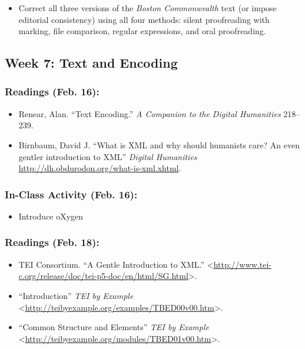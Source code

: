 \documentclass[]{article}
\begin{document}
\begin{itemize}
\itemsep1pt\parskip0pt
\item
  Correct all three versions of the \emph{Boston Commonwealth} text (or
  impose editorial consistency) using all four methods: silent
  proofreading with marking, file comparison, regular expressions, and
  oral proofreading.
\end{itemize}

\subsection{Week 7: Text and Encoding}\label{week-7-text-and-encoding}

\subsubsection{Readings (Feb. 16):}\label{readings-feb.-16}

\begin{itemize}
\itemsep1pt\parskip0pt
\item
  Renear, Alan. ``Text Encoding.'' \emph{A Companion to the Digital
  Humanities} 218--239.
\item
  Birnbaum, David J. ``What is XML and why should humanists care? An
  even gentler introduction to XML'' \emph{Digital Humanities}
  \url{http://dh.obdurodon.org/what-is-xml.xhtml}.
\end{itemize}

\subsubsection{In-Class Activity (Feb.
16):}\label{in-class-activity-feb.-16}

\begin{itemize}
\itemsep1pt\parskip0pt
\item
  Introduce oXygen
\end{itemize}

\subsubsection{Readings (Feb. 18):}\label{readings-feb.-18}

\begin{itemize}
\itemsep1pt\parskip0pt
\item
  TEI Consortium. ``A Gentle Introduction to XML.''
  \textless{}\url{http://www.tei-c.org/release/doc/tei-p5-doc/en/html/SG.html}\textgreater{}.
\item
  ``Introduction'' \emph{TEI by Example}
  \textless{}\url{http://teibyexample.org/examples/TBED00v00.htm}\textgreater{}.
\item
  ``Common Structure and Elements'' \emph{TEI by Example}
  \textless{}\url{http://teibyexample.org/modules/TBED01v00.htm}\textgreater{}.
\end{itemize}
\end{document}
